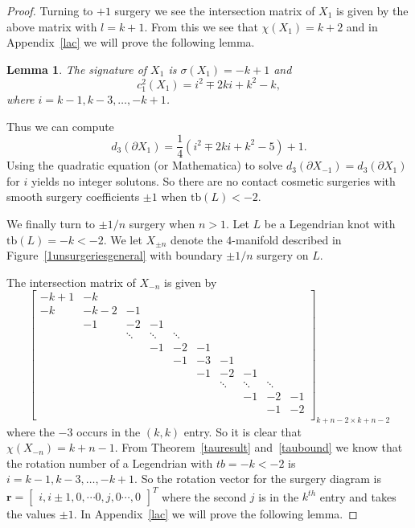 \documentclass[12pt]{amsart}
\newtheorem{lemma}[theorem]{Lemma}
\theoremstyle{definition}
\theoremstyle{definition}
\newcommand{\tb}{\text{tb}}
\begin{document}
\begin{proof}
			Turning to $+1$ surgery we see the intersection matrix of $X_1$ is given by the above matrix with $l=k+1$. From this we see that $\chi(X_1)=k+2$ and in Appendix~\ref{lac} we will prove the following lemma. 
			\begin{lemma}\label{lem2}
				The signature of $X_{1}$ is $\sigma(X_{1})=-k+1$ and 
				\[
				c_1^2(X_{1})=i^2\mp 2ki+k^2-k,
				\]
				where $i=k-1,k-3,\ldots, -k+1$. 
			\end{lemma}
			Thus we can compute
			\[
			d_3(\partial X_1)=\frac 14\left(i^2\mp 2ki +k^2-5\right)+1.
			\]
			Using the quadratic equation (or Mathematica) to solve $d_3(\partial X_{-1})=d_3(\partial X_1)$ for $i$ yields no integer solutons. So there are no contact cosmetic surgeries with smooth surgery coefficients $\pm 1$ when $\tb(L)<-2$. 
			
			We finally turn to $\pm 1/n$ surgery when $n>1$. Let $L$ be a Legendrian knot with $\tb(L)=-k<-2$. We let $X_{\pm n}$ denote the $4$-manifold described in Figure~\ref{1unsurgeriesgeneral} with boundary $\pm 1/n$ surgery on $L$.
			
			The intersection matrix of $X_{-n}$ is given by 
			$$
			\begin{bmatrix}
				-k+1 & -k &  & &  & \\
				-k & -k-2 & -1 & &   &\\
				& -1 & -2 & -1&   & \\
				&  &  \ddots &\ddots &  \ddots&\\
				&&  &  -1 &-2 &  -1&\\
				&&&  &  -1 &-3 &  -1&\\
				&&&&  &  -1 &-2 &  -1&\\
				&&&&	&  &  \ddots &\ddots &  \ddots&\\
				&&&&&   &&-1 & -2& -1  \\
				&&&&&   &&&-1 & -2  \\
			\end{bmatrix}_{k+n-2 \times k+n-2}
			$$ 
			where the $-3$ occurs in the $(k,k)$ entry. 
			So it is clear that $\chi(X_{-n})=k+n-1$. From Theorem~\ref{tauresult} and~\ref{taubound} we know that the rotation number of a Legendrian with $tb=-k<-2$ is $i=k-1,k-3,\ldots, -k+1$. So the rotation vector for the surgery diagram is $\mathbf{r}=\begin{bmatrix}i,i\pm 1, 0, \cdots 0,  j, 0 \cdots, 0\end{bmatrix}^T$ where the second $j$ is in the $k^{th}$ entry and takes the values $\pm 1$. In Appendix~\ref{lac} we will prove the following lemma.
			

\end{proof}
\end{document}

